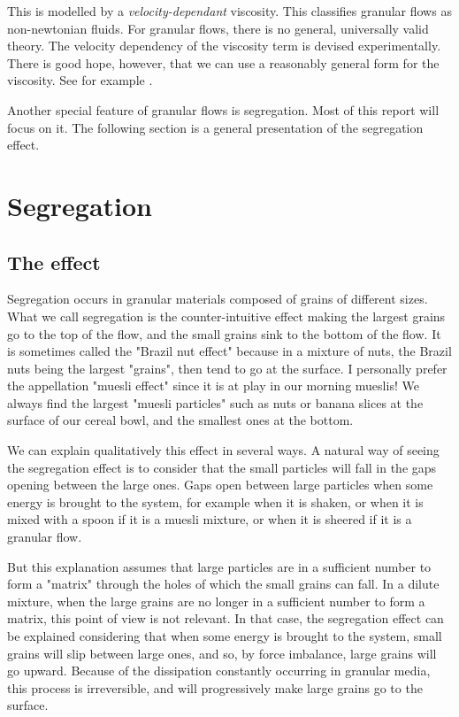 This is modelled by a \textit{velocity-dependant} viscosity. This classifies granular flows as non-newtonian fluids. For granular flows, there is no general, universally valid theory. The velocity dependency of the viscosity term is devised experimentally. There is good hope, however, that we can use a reasonably general form for the viscosity. See for example \cite{pouli}.

Another special feature of granular flows is segregation. Most of this report will focus on it. The following section is a general presentation of the segregation effect.

\section{Segregation}

\subsection{The effect}

Segregation occurs in granular materials composed of grains of different sizes. What we call segregation is the counter-intuitive effect making the largest grains go to the top of the flow, and the small grains sink to the bottom of the flow. 
It is sometimes called the "Brazil nut effect" because in a mixture of nuts, the Brazil nuts being the largest "grains", then tend to go at the surface. I personally prefer the appellation "muesli effect" since it is at play in our morning mueslis! We always find the largest "muesli particles" such as nuts or banana slices at the surface of our cereal bowl, and the smallest ones at the bottom. 

We can explain qualitatively this effect in several ways. A natural way of seeing the segregation effect is to consider that the small particles will fall in the gaps opening between the large ones. Gaps open between large particles when some energy is brought to the system, for example when it is shaken, or when it is mixed with a spoon if it is a muesli mixture, or when it is sheered if it is a granular flow.

But this explanation assumes that large particles are in a sufficient number to form a "matrix" through the holes of which the small grains can fall. 
In a dilute mixture, when the large grains are no longer in a sufficient number to form a matrix, this point of view is not relevant. 
In that case, the segregation effect can be explained considering that when some energy is brought to the system, small grains will slip between large ones, and so, by force imbalance, large grains will go upward.
Because of the dissipation constantly occurring in granular media, this process is irreversible, and will progressively make large grains go to the surface.

